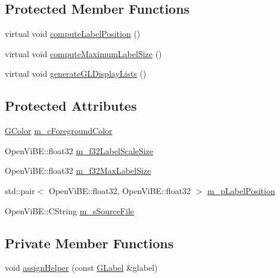 \subsection*{Protected Member Functions}
\begin{DoxyCompactItemize}
\item 
virtual void \hyperlink{classOpenViBEApplications_1_1GLabel_a98fe7f61d0fc4738737786f9f82cd66a}{computeLabelPosition} ()
\item 
virtual void \hyperlink{classOpenViBEApplications_1_1GLabel_a7f0688b34724d97ba7f01383b5b63363}{computeMaximumLabelSize} ()
\item 
virtual void \hyperlink{classOpenViBEApplications_1_1GLabel_a445a03a33e74bc64b93e4a3fd2629953}{generateGLDisplayLists} ()
\end{DoxyCompactItemize}
\subsection*{Protected Attributes}
\begin{DoxyCompactItemize}
\item 
\hyperlink{structOpenViBEApplications_1_1GColor}{GColor} \hyperlink{classOpenViBEApplications_1_1GLabel_a00c551c0b80222bf15cddda02019a5c1}{m\_\-cForegroundColor}
\item 
OpenViBE::float32 \hyperlink{classOpenViBEApplications_1_1GLabel_a2460bcf3f4dc7d49f9ece6047e0d9c36}{m\_\-f32LabelScaleSize}
\item 
OpenViBE::float32 \hyperlink{classOpenViBEApplications_1_1GLabel_a88c6f194cb24755a43b40c12bdb26c3a}{m\_\-f32MaxLabelSize}
\item 
std::pair$<$ OpenViBE::float32, OpenViBE::float32 $>$ \hyperlink{classOpenViBEApplications_1_1GLabel_af644cef82c93077e6c16e562c637dc55}{m\_\-pLabelPosition}
\item 
OpenViBE::CString \hyperlink{classOpenViBEApplications_1_1GLabel_a0dda31dd749bffd354f974ce3099cdb7}{m\_\-sSourceFile}
\end{DoxyCompactItemize}
\subsection*{Private Member Functions}
\begin{DoxyCompactItemize}
\item 
void \hyperlink{classOpenViBEApplications_1_1GLabel_a089157f69763604ccefe0d01857f8f3f}{assignHelper} (const \hyperlink{classOpenViBEApplications_1_1GLabel}{GLabel} \&glabel)
\end{DoxyCompactItemize}


